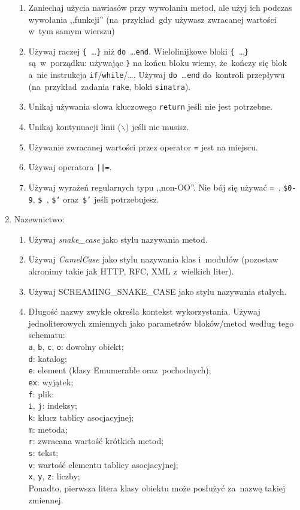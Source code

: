 \begin{enumerate}
\begin{enumerate}
    \item Zaniechaj użycia nawiasów przy wywołaniu metod, ale użyj ich podczas wywołania ,,funkcji'' (na~przykład~gdy używasz zwracanej wartości w~tym samym wierszu)
    \item Używaj raczej \mbox{\texttt{\{} \ldots \texttt{\}}} niż \mbox{\texttt{do} \ldots \texttt{end}}. Wielolinijkowe bloki \mbox{\texttt{\{} \ldots \texttt{\}}} są~w~porządku: używając \texttt{\}} na końcu bloku wiemy, że~kończy się blok a~nie instrukcja \texttt{if}/\texttt{while}/\ldots. Używaj \mbox{\texttt{do} \ldots \texttt{end}} do~kontroli przepływu (na~przykład~zadania \texttt{rake}, bloki \texttt{sinatra}).
    \item Unikaj używania słowa kluczowego \texttt{return} jeśli nie jest potrzebne.
    \item Unikaj kontynuacji linii (\texttt{$ \backslash $}) jeśli nie musisz.
    \item Używanie zwracanej wartości przez operator \texttt{=} jest na miejscu.
    \item Używaj operatora \texttt{||=}.
    \item Używaj wyrażeń regularnych typu ,,non-OO''.  Nie bój się używać \texttt{=~}, \texttt{\$0-9}, \texttt{\$~}, \texttt{\$`} oraz~\texttt{\$'} jeśli potrzebujesz.
  \end{enumerate}
  \item Nazewnictwo:
  \begin{enumerate}
    \item Używaj \textit{snake\_case} jako stylu nazywania metod.
    \item Używaj \textit{CamelCase} jako stylu nazywania klas i~modułów (pozostaw akronimy takie jak HTTP, RFC, XML z~wielkich liter).
    \item Używaj SCREAMING\_SNAKE\_CASE jako stylu nazywania stałych.
    \item Długość nazwy zwykle określa kontekst wykorzystania. Używaj jednoliterowych zmiennych jako parametrów bloków/metod według tego schematu:\\
      \texttt{a}, \texttt{b}, \texttt{c}, \texttt{o}: dowolny obiekt;\\
      \texttt{d}: katalog;\\
      \texttt{e}: element (klasy Emumerable oraz~pochodnych);\\
      \texttt{ex}: wyjątek;\\
      \texttt{f}: plik:\\
      \texttt{i}, \texttt{j}: indeksy;\\
      \texttt{k}: klucz tablicy asocjacyjnej;\\
      \texttt{m}: metoda;\\
      \texttt{r}: zwracana wartość krótkich metod;\\
      \texttt{s}: tekst;\\
      \texttt{v}: wartość elementu tablicy asocjacyjnej;\\
      \texttt{x}, \texttt{y}, \texttt{z}: liczby;\\
      Ponadto, pierwsza litera klasy obiektu może posłużyć za~nazwę takiej zmiennej.


\end{enumerate}
\end{enumerate}

